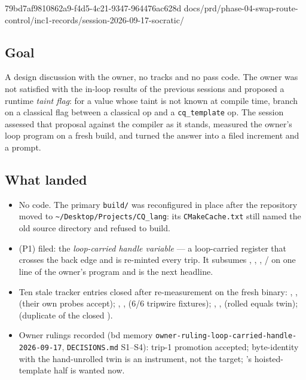 %
  {79bd7af9}{810862a9-f4d5-4c21-9347-964476ac628d}%
  {docs/prd/phase-04-swap-route-control/inc1-records/session-2026-09-17-socratic/}

\subsection*{Goal}
A design discussion with the owner, no tracks and no pass code. The owner was not
satisfied with the in-loop results of the previous sessions and proposed a runtime
\emph{taint flag}: for a value whose taint is not known at compile time, branch on a
classical flag between a classical op and a \texttt{cq\_template} op. The session
assessed that proposal against the compiler as it stands, measured the owner's loop
program on a fresh build, and turned the answer into a filed increment and a prompt.

\subsection*{What landed}
\begin{itemize}
  \item No code. The primary \texttt{build/} was reconfigured in place after the
        repository moved to \texttt{\textasciitilde/Desktop/Projects/CQ\_lang}: its
        \texttt{CMakeCache.txt} still named the old source directory and refused to build.
  \item {} (P1) filed: the \emph{loop-carried handle variable} --- a loop-carried
        register that crosses the back edge and is re-minted every trip. It subsumes
        , , , / on one line of the
        owner's program and is the next headline.
  \item Ten stale tracker entries closed after re-measurement on the fresh binary:
        , ,  (their own probes accept); , ,
         (6/6 tripwire fixtures); , ,  (rolled equals
        twin);  (duplicate of the closed ).
  \item Owner rulings recorded (bd memory \texttt{owner-ruling-loop-carried-handle-2026-09-17},
        \texttt{DECISIONS.md} S1--S4): trip-1 promotion accepted; byte-identity with the
        hand-unrolled twin is an instrument, not the target; 's hoisted-template
        half is wanted now.
\end{itemize}

